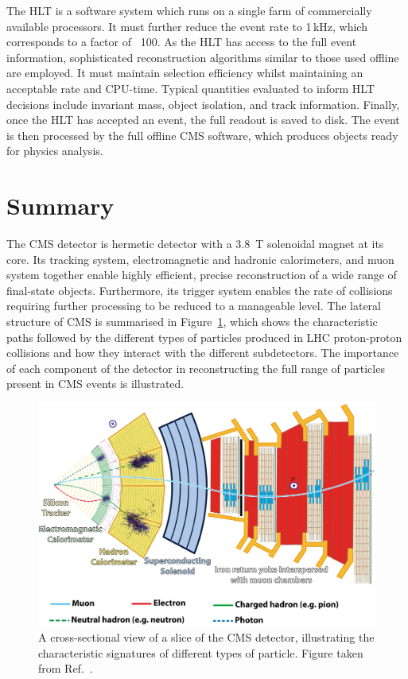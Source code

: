 The HLT is a software system which runs on a single farm of commercially available processors. %
It must further reduce the event rate to 1\,kHz, which corresponds to a factor of ~100.
As the HLT has access to the full event information, sophisticated reconstruction algorithms similar to those used offline are employed. 
It must maintain selection efficiency whilst maintaining an acceptable rate and CPU-time. 
Typical quantities evaluated to inform HLT decisions include invariant mass, object isolation, and track information.
Finally, once the HLT has accepted an event, the full readout is saved to disk.
The event is then processed by the full offline CMS software, which produces objects ready for physics analysis.

\section{Summary}

The CMS detector is hermetic detector with a \SI{3.8}{T} solenoidal magnet at its core.
Its tracking system, electromagnetic and hadronic calorimeters, and muon system 
together enable highly efficient, precise reconstruction of a wide range of final-state objects.
Furthermore, its trigger system enables the rate of collisions 
requiring further processing to be reduced to a manageable level.
The lateral structure of CMS is summarised in Figure~\ref{fig:detector_CMSslice}, 
which shows the characteristic paths followed by the different types of particles 
produced in LHC proton-proton collisions and how they interact with the different subdetectors.
The importance of each component of the detector in reconstructing 
the full range of particles present in CMS events is illustrated.

\begin{figure}[h!]
  \centering
  \includegraphics[width=\textwidth]{Figures/Detector/CMSslice.png}
  \caption[A cross-sectional view of the CMS detector]
  {
    A cross-sectional view of a slice of the CMS detector, 
    illustrating the characteristic signatures of different types of particle.
    Figure taken from Ref.~\cite{CMSslice}.
  }
  \label{fig:detector_CMSslice}
\end{figure}

